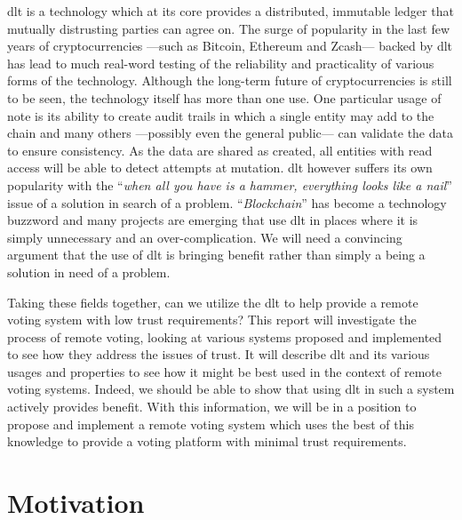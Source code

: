 \Gls{dlt} is a technology which at its core provides a distributed, immutable ledger that mutually distrusting parties can agree on. The surge of popularity in the last few years of cryptocurrencies ---such as Bitcoin, Ethereum and Zcash--- backed by \gls{dlt} has lead to much real-word testing of the reliability and practicality of various forms of the technology. Although the long-term future of cryptocurrencies is still to be seen, the technology itself has more than one use. One particular usage of note is its ability to create audit trails in which a single entity may add to the chain and many others ---possibly even the general public--- can validate the data to ensure consistency. As the data are shared as created, all entities with read access will be able to detect attempts at mutation. \Gls{dlt} however suffers its own popularity with the ``\emph{when all you have is a hammer, everything looks like a nail}'' issue of a solution in search of a problem. ``\emph{Blockchain}'' has become a technology buzzword and many projects are emerging that use \gls{dlt} in places where it is simply unnecessary and an over-complication. We will need a convincing argument that the use of \gls{dlt} is bringing benefit rather than simply a being a solution in need of a problem.

Taking these fields together, can we utilize the \gls{dlt} to help provide a remote voting system with low trust requirements? This report will investigate the process of remote voting, looking at various systems proposed and implemented to see how they address the issues of trust. It will describe \gls{dlt} and its various usages and properties to see how it might be best used in the context of remote voting systems. Indeed, we should be able to show that using \gls{dlt} in such a system actively provides benefit. With this information, we will be in a position to propose and implement a remote voting system which uses the best of this knowledge to provide a voting platform with minimal trust requirements.


\section{Motivation}
\label{ch:intro:motiv}


